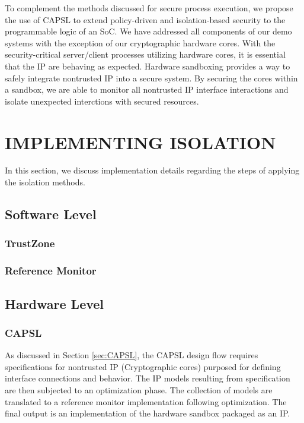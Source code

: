 \documentclass[sigconf]{acmart}
\theoremstyle{plain}
\theoremstyle{remark}
\begin{document}
To complement the methods discussed for secure process execution, we propose the use of CAPSL to extend policy-driven and isolation-based security to the programmable logic of an SoC. We have addressed all components of our demo systems with the exception of our cryptographic hardware cores. With the security-critical server/client processes utilizing hardware cores, it is essential that the IP are behaving as expected. Hardware sandboxing provides a way to safely integrate nontrusted IP into a secure system. By securing the cores within a sandbox, we are able to monitor all nontrusted IP interface interactions and isolate unexpected interctions with secured resources.





\section{IMPLEMENTING ISOLATION} \label{sec:Implementation}
In this section, we discuss implementation details regarding the steps of applying the isolation methods.

\subsection{Software Level}

\subsubsection{TrustZone}

\subsubsection{Reference Monitor}

\subsection{Hardware Level}

\subsubsection{CAPSL}

As discussed in Section \ref{sec:CAPSL}, the CAPSL design flow requires specifications for nontrusted IP (Cryptographic cores) purposed for defining interface connections and behavior. The IP models resulting from specification are then subjected to an optimization phase. The collection of models are translated to a reference monitor implementation following optimization. The final output is an implementation of the hardware sandbox packaged as an IP.
\end{document}
